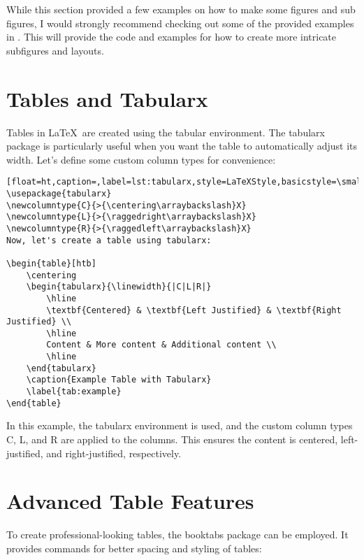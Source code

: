 		While this section provided a few examples on how to make some figures and sub figures, I would strongly recommend checking out some of the provided examples in .
		This will provide the code and examples for how to create more intricate subfigures and layouts.
		
	\section{Tables and Tabularx}
		Tables in \LaTeX\ are created using the tabular environment. 
		The tabularx package is particularly useful when you want the table to automatically adjust its width. 
		Let's define some custom column types for convenience:

		\begin{lstlisting}[float=ht,caption=,label=lst:tabularx,style=LaTeXStyle,basicstyle=\small\ttfamily,]
\usepackage{tabularx}
\newcolumntype{C}{>{\centering\arraybackslash}X}
\newcolumntype{L}{>{\raggedright\arraybackslash}X}
\newcolumntype{R}{>{\raggedleft\arraybackslash}X}
Now, let's create a table using tabularx:

\begin{table}[htb]
	\centering
	\begin{tabularx}{\linewidth}{|C|L|R|}
		\hline
		\textbf{Centered} & \textbf{Left Justified} & \textbf{Right Justified} \\
		\hline
		Content & More content & Additional content \\
		\hline
	\end{tabularx}
	\caption{Example Table with Tabularx}
	\label{tab:example}
\end{table}
		\end{lstlisting}

		In this example, the tabularx environment is used, and the custom column types C, L, and R are applied to the columns. 
		This ensures the content is centered, left-justified, and right-justified, respectively.

	\section{Advanced Table Features}

		To create professional-looking tables, the booktabs package can be employed. 
		It provides commands for better spacing and styling of tables:

